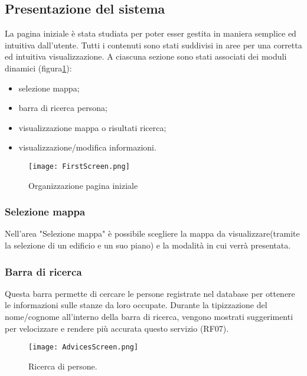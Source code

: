 \FloatBarrier
\subsection{Presentazione del sistema}
La pagina iniziale è stata studiata per poter esser gestita in maniera semplice ed intuitiva dall'utente.  Tutti i contenuti sono stati suddivisi in aree  per  una  corretta  ed  intuitiva  visualizzazione. 
A  ciascuna sezione   sono   stati associati dei moduli dinamici (figura\ref{Screen:first}):

\begin{itemize}
\item selezione mappa;
\item barra di ricerca persona;
\item visualizzazione mappa o risultati ricerca;
\item visualizzazione/modifica informazioni.
\end{itemize}

\begin{figure}[!htb]
\centering%
\texttt{[image: FirstScreen.png]}%
\caption{Organizzazione pagina iniziale}\label{Screen:first}%
\end{figure}

\FloatBarrier
\subsubsection*{Selezione mappa}
Nell'area "Selezione mappa" è possibile scegliere la mappa da visualizzare(tramite la selezione di un edificio e un suo piano) e la modalità in cui verrà presentata.

\subsubsection*{Barra di ricerca}
Questa barra permette di cercare le persone registrate nel database per ottenere le informazioni sulle stanze da loro occupate. Durante la tipizzazione del nome/cognome all'interno della barra di ricerca, vengono mostrati suggerimenti per velocizzare e rendere più accurata questo servizio (RF07).

\begin{figure}[!htb]
\centering%
\texttt{[image: AdvicesScreen.png]}%
\caption{Ricerca di persone.}\label{Screen:advices}%
\end{figure}
\FloatBarrier

